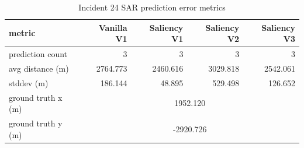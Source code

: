 \begin{table}[ht]
\centering
\caption{Incident 24 SAR prediction error metrics}
\label{tab:sar-incident-24}
\begin{tabular}{lrrrr}
\hline
metric & Vanilla V1 & Saliency V1 & Saliency V2 & Saliency V3 \\
\hline
prediction count & 3 & 3 & 3 & 3 \\
avg distance (m) & 2764.773 & 2460.616 & 3029.818 & 2542.061 \\
stddev (m) & 186.144 & 48.895 & 529.498 & 126.652 \\
ground truth x (m) & \multicolumn{4}{c}{1952.120} \\
ground truth y (m) & \multicolumn{4}{c}{-2920.726} \\
\hline
\end{tabular}
\end{table}

